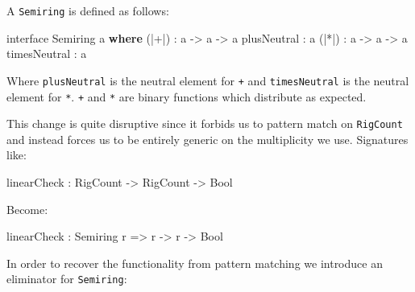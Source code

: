 \documentclass[
]{article}
\newenvironment{Shaded}{}{}
\newcommand{\DataTypeTok}[1]{\textcolor[rgb]{0.56,0.13,0.00}{#1}}
\newcommand{\KeywordTok}[1]{\textcolor[rgb]{0.00,0.44,0.13}{\textbf{#1}}}
\newcommand{\NormalTok}[1]{#1}
\newcommand{\OperatorTok}[1]{\textcolor[rgb]{0.40,0.40,0.40}{#1}}
\newcommand{\OtherTok}[1]{\textcolor[rgb]{0.00,0.44,0.13}{#1}}
\begin{document}
A \texttt{Semiring} is defined as follows:

\begin{Shaded}
\begin{Highlighting}[]
\NormalTok{interface }\DataTypeTok{Semiring}\NormalTok{ a }\KeywordTok{where}
\NormalTok{  (}\OperatorTok{|+|}\NormalTok{) }\OperatorTok{:}\NormalTok{ a }\OtherTok{{-}\textgreater{}}\NormalTok{ a }\OtherTok{{-}\textgreater{}}\NormalTok{ a}
\NormalTok{  plusNeutral }\OperatorTok{:}\NormalTok{ a}
\NormalTok{  (}\OperatorTok{|*|}\NormalTok{) }\OperatorTok{:}\NormalTok{ a }\OtherTok{{-}\textgreater{}}\NormalTok{ a }\OtherTok{{-}\textgreater{}}\NormalTok{ a}
\NormalTok{  timesNeutral }\OperatorTok{:}\NormalTok{ a}
\end{Highlighting}
\end{Shaded}

Where \texttt{plusNeutral} is the neutral element for
\texttt{\textbar{}+\textbar{}} and \texttt{timesNeutral} is the neutral
element for \texttt{\textbar{}*\textbar{}}.
\texttt{\textbar{}+\textbar{}} and \texttt{\textbar{}*\textbar{}} are
binary functions which distribute as expected.

This change is quite disruptive since it forbids us to pattern match on
\texttt{RigCount} and instead forces us to be entirely generic on the
multiplicity we use. Signatures like:

\begin{Shaded}
\begin{Highlighting}[]
\NormalTok{linearCheck }\OperatorTok{:} \DataTypeTok{RigCount} \OtherTok{{-}\textgreater{}} \DataTypeTok{RigCount} \OtherTok{{-}\textgreater{}} \DataTypeTok{Bool}
\end{Highlighting}
\end{Shaded}

Become:

\begin{Shaded}
\begin{Highlighting}[]
\NormalTok{linearCheck }\OperatorTok{:} \DataTypeTok{Semiring}\NormalTok{ r }\OtherTok{=\textgreater{}}\NormalTok{ r }\OtherTok{{-}\textgreater{}}\NormalTok{ r }\OtherTok{{-}\textgreater{}} \DataTypeTok{Bool}
\end{Highlighting}
\end{Shaded}

In order to recover the functionality from pattern matching we introduce
an eliminator for \texttt{Semiring}:
\end{document}
